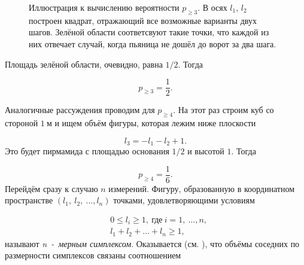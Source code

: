 \documentclass[12pt]{article}
\begin{document}
\begin{figure}[htbp]
	\centering
	\caption{Иллюстрация к вычислению вероятности $p_{\ge 3}$. В осях $l_1$, $l_2$ построен квадрат, отражающий все возможные варианты двух шагов. Зелёной области соответсвуют такие точки, что каждой из них отвечает случай, когда пьяница не дошёл до ворот за два шага.}
	\label{fig:figure1}
\end{figure}
Площадь зелёной области, очевидно, равна $1/2$. Тогда

\begin{equation}
	p_{\ge 3} = \dfrac{1}{2}.
\end{equation}

\par Аналогичные рассуждения проводим для $p_{\ge 4}$. На этот раз строим куб со стороной $1\ \text{м}$ и ищем объём фигуры, которая лежим ниже плоскости 

\begin{equation}
	l_3 = -l_1 -l_2 +1.
\end{equation}
Это будет пирмамида с площадью основания $1/2$ и высотой $1$. Тогда 

\begin{equation}
	p_{\ge 4} = \dfrac{1}{6}.
\end{equation}
Перейдём сразу к случаю $n$ измерений. Фигуру, образованную в координатном пространстве $(l_1,\ l_2,\ \ldots, l_n)$ точками, удовлетворяющими условиям

\begin{equation}
	\begin{split}
		& 0 \le l_i \ge 1,\ \text{где}\ i=1,\ \ldots, n,\\
		& l_1 + l_2 + \ldots + l_n \ge 1,
	\end{split}
\end{equation}
называют \emph{n~\--~мерным симплексом}. Оказывается (см. \cite{w2}), что объёмы соседних по размерности симплексов связаны соотношением
\end{document}
